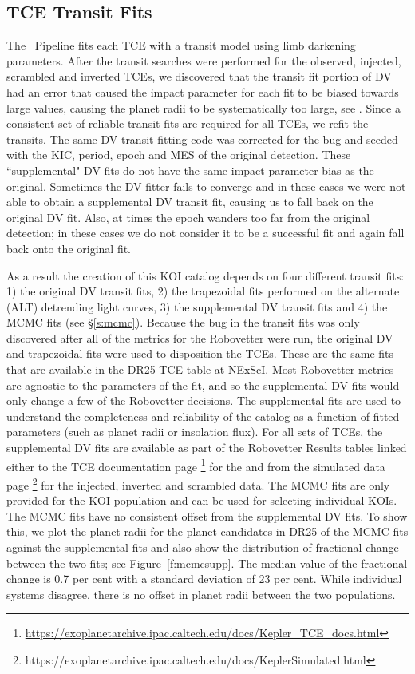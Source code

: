 \subsection{TCE Transit Fits}

The \Kepler\ Pipeline fits each TCE with a \citet{Mandel2002} transit model using \citet{Claret2000} limb darkening parameters. After the transit searches were performed for the observed, injected, scrambled and inverted TCEs, we discovered that the transit fit portion of DV had an error that caused the impact parameter for each fit to be biased towards large values, causing the planet radii to be systematically too large, see \citet{KSCI19110}. Since a consistent set of reliable transit fits are required for all TCEs, we refit the transits.  The same DV transit fitting code was corrected for the bug and seeded with the KIC, period, epoch and MES of the original detection. These ``supplemental" DV fits do not have the same impact parameter bias as the original.  Sometimes the DV fitter fails to converge and in these cases we were not able to obtain a supplemental DV transit fit, causing us to fall back on the original DV fit. Also, at times the epoch wanders too far from the original detection; in these cases we do not consider it to be a successful fit and again fall back onto the original fit.

As a result the creation of this KOI catalog depends on four different transit fits: 1) the original DV transit fits, 2) the trapezoidal fits performed on the alternate (ALT) \citet{Garcia2010} detrending light curves, 3) the supplemental DV transit fits and 4) the MCMC fits (see \S\ref{s:mcmc}).  Because the bug in the transit fits was only discovered after all of the metrics for the Robovetter were run, the original DV and trapezoidal fits were used to disposition the TCEs. These are the same fits that are available in the DR25 TCE table at NExScI.  Most Robovetter metrics are agnostic to the parameters of the fit, and so the supplemental DV fits would only change a few of the Robovetter decisions.  The supplemental fits are used to understand the completeness and reliability of the catalog as a function of fitted parameters (such as planet radii or insolation flux).  For all sets of TCEs, the supplemental DV fits are available as part of the Robovetter Results tables linked either to the TCE documentation page \footnote{\url{https://exoplanetarchive.ipac.caltech.edu/docs/Kepler\_TCE\_docs.html}} for the  and from the simulated data page \footnote{https://exoplanetarchive.ipac.caltech.edu/docs/KeplerSimulated.html}  \citep[see][]{KSCI19110,KSCI19114} for the injected, inverted and scrambled data. The MCMC fits are only provided for the KOI population and can be used for selecting individual KOIs. The MCMC fits have no consistent offset from the supplemental DV fits.  To show this, we plot the planet radii for the planet candidates in DR25 of the MCMC fits against the supplemental fits and also show the distribution of fractional change between the two fits; see Figure~\ref{f:mcmcsupp}. The median value of the fractional change is 0.7 per cent with a standard deviation of 23 per cent. While individual systems disagree, there is no offset in planet radii between the two populations.  

